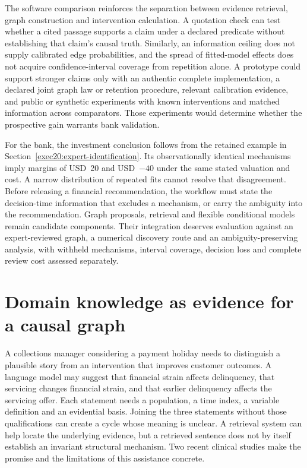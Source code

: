 The software comparison reinforces the separation between evidence retrieval,
graph construction and intervention calculation. A quotation check can test
whether a cited passage supports a claim under a declared predicate without
establishing that claim's causal truth. Similarly, an information ceiling does
not supply calibrated edge probabilities, and the spread of fitted-model
effects does not acquire confidence-interval coverage from repetition alone.
A prototype could support stronger claims only with an authentic complete
implementation, a declared joint graph law or retention procedure, relevant
calibration evidence, and public or synthetic experiments with known
interventions and matched information across comparators. Those experiments
would determine whether the prospective gain warrants bank validation.

For the bank, the investment conclusion follows from the retained example in
Section~\ref{exec20:expert-identification}. Its observationally identical
mechanisms imply margins of USD~20 and USD~$-40$ under the same stated
valuation and cost. A narrow distribution of repeated fits cannot resolve
that disagreement. Before releasing a financial recommendation, the workflow
must state the decision-time information that excludes a mechanism, or carry
the ambiguity into the recommendation. Graph proposals, retrieval and flexible
conditional models remain candidate components. Their integration deserves
evaluation against an expert-reviewed graph, a numerical discovery route and
an ambiguity-preserving analysis, with withheld mechanisms, interval coverage,
decision loss and complete review cost assessed separately.


\section{Domain knowledge as evidence for a causal graph}
\label{exec22:domain-scope}

A collections manager considering a payment holiday needs to distinguish a
plausible story from an intervention that improves customer outcomes. A language
model may suggest that financial strain affects delinquency, that servicing
changes financial strain, and that earlier delinquency affects the servicing
offer. Each statement needs a population, a time index, a variable definition
and an evidential basis. Joining the three statements without those qualifications
can create a cycle whose meaning is unclear. A retrieval system can help locate
the underlying evidence, but a retrieved sentence does not by itself establish
an invariant structural mechanism. Two recent clinical studies make the promise
and the limitations of this assistance concrete.

